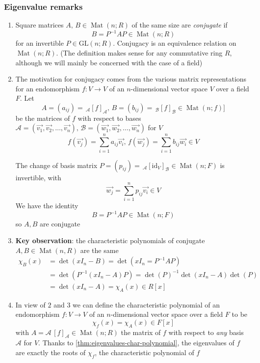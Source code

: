 \documentclass[landscape, 8pt]{extarticle}
\DeclareMathOperator{\Mat}{Mat}
\begin{document}
\begin{multicols}{3}
\subsubsection{Eigenvalue remarks}
\begin{enumerate}
    \item Square matrices $A,\,B\in \Mat(n;R)$ of the same size are \textit{conjugate} if
        \[B = P^{-1}AP\in \Mat(n;R)\]
    for an invertible $P\in \text{GL}(n;R)$. Conjugacy is an equivalence relation on $\Mat(n;R)$. (The definition makes sense for any commutative ring $R$, although we will mainly be concerned with the case of a field)
    \item The motivation for conjugacy comes from the various matrix representations for an endomorphism $f : V \to V$ of an $n$-dimensional vector space $V$ over a field $F$. Let
        \[A = (a_{ij}) =\,_{\mathcal{A}}[f]_{\mathcal{A}},\,B = (b_{ij}) =\,_{\mathcal{B}}[f]_{\mathcal{B}}\in \Mat(n;f)]\]
        be the matrices of $f$ with respect to bases $\mathcal{A} = (\vec{v_{1}}, \vec{v_{2}},\dots,\vec{v_{n}}),\,\mathcal{B} = (\vec{w_{1}}, \vec{w_{2}},\dots,\vec{w_{n}})$ for $V$
        \[f(\vec{v_{j}}) = \sum_{i = 1}^{n}a_{ij}\vec{v_{i}},\,f(\vec{w_{j}}) = \sum_{i = 1}^{n}b_{ij}\vec{w_{i}}\in V\]

        The change of basis matrix $P = (p_{ij}) =\,_{\mathcal{A}} [\text{id}_{V}]_{\mathcal{B}}\in \Mat(n;F)$ is invertible, with
        \[\vec{w_{j}} = \sum_{i = 1}^{n}p_{ij}\vec{v_{i}}\in V\]
        We have the identity
        \[B = P^{-1}AP\in \Mat(n;F)\]
        so $A,B$ are conjugate
    \item \textbf{Key observation}: the characteristic polynomials of conjugate $A,B\in \Mat(n,R)$ are the same
        \begin{align*}
            \chi_{B}(x) &= \det(x I_{n} - B) = \det(x I_{n} = P^{-1}AP) \\
            &= \det(P^{-1}(x I_{n} - A)P) = \det(P)^{-1}\det(x I_{n} - A)\det(P) \\
            &= \det(xI_{n} - A) = \chi_{A}(x)\in R[x]
        \end{align*}
    \item In view of $2$ and $3$ we can define the characteristic polynomial of an endomorphism $f : V\to V$ of an $n$-dimensional vector space over a field $F$ to be
        \[\chi_{f}(x) = \chi_{A}(x)\in F[x]\]
        with $A =\mathcal{A}\,[f]_{\mathcal{A}}\in \Mat(n;R)$ the matrix of $f$ with respect to \textit{any} basis $\mathcal{A}$ for $V$. Thanks to \ref{thm:eigenvalues-char-polynomial}, the eigenvalues of $f$ are exactly the roots of $\chi_{f}$, the characteristic polynomial of $f$
\end{enumerate}


\end{multicols}
\end{document}
